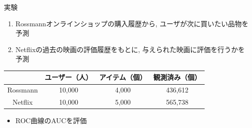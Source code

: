 \documentclass[aspectratio=43, dvipdfmx, 11pt]{beamer} %
\begin{document}
\begin{frame}{実験}
    \begin{enumerate}
        \item Rossmannオンラインショップの購入履歴から, ユーザが次に買いたい品物を予測
        \item Netflixの過去の映画の評価履歴をもとに, 与えられた映画に評価を行うかを予測
    \end{enumerate}
    \begin{table}[htb]
        \begin{tabular}{|c|c|c|c|} \hline
                    &ユーザー（人）&アイテム（個） &観測済み（個） \\ \hline
        Rossmann    &10,000       &4,000       &436,612 \\\hline
        Netflix     &10,000       &5,000       &565,738 \\ \hline
        \end{tabular}
      \end{table}
      \begin{itemize}
        \item ROC曲線のAUCを評価
      \end{itemize}
\end{frame}
\end{document}
